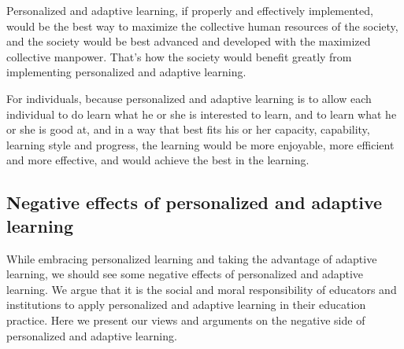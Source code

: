 \documentclass[english]{textolivre}
\begin{document}
Personalized and adaptive learning, if properly and effectively implemented, would be the best way to maximize the collective human resources of the society, and the society would be best advanced and developed with the maximized collective manpower. That’s how the society would benefit greatly from implementing personalized and adaptive learning.

For individuals, because personalized and adaptive learning is to allow each individual to do learn what he or she is interested to learn, and to learn what he or she is good at, and in a way that best fits his or her capacity, capability, learning style and progress, the learning would be more enjoyable, more efficient and more effective, and would achieve the best in the learning.

\subsection{Negative effects of personalized and adaptive learning}
While embracing personalized learning and taking the advantage of adaptive learning, we should see some negative effects of personalized and adaptive learning. We argue that it is the social and moral responsibility of educators and institutions to apply personalized and adaptive learning in their education practice. Here we present our views and arguments on the negative side of personalized and adaptive learning.
\end{document}
